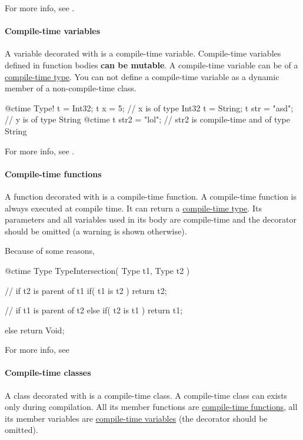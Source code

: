 For more info, see .

\paragraph{Compile-time variables}
A variable decorated with  is a compile-time variable. Compile-time variables defined in function bodies \textbf{can be mutable}. A compile-time variable can be of a \hyperref[ctime:class]{compile-time type}. You can not define a compile-time variable as a dynamic member of a non-compile-time class.

\begin{code}
@ctime Type! t = Int32;
t x = 5; // x is of type Int32
t = String;
t str = "asd"; // y is of type String
@ctime t str2 = "lol"; // str2 is compile-time and of type String
\end{code}

For more info, see .

\paragraph{Compile-time functions}
A function decorated with  is a compile-time function. A compile-time function is always executed at compile time. It can return a \hyperref[ctime:class]{compile-time type}. Its parameters and all variables used in its body are compile-time and the  decorator should be omitted (a warning is shown otherwise).

Because of some reasons, 

\begin{code}
@ctime Type TypeIntersection( Type t1, Type t2 ) {
	// if t2 is parent of t1
	if( t1 is t2 )
		return t2;
		
	// if t1 is parent of t2
	else if( t2 is t1 )
		return t1;
	
	else
		return Void;
}
\end{code}

For more info, see 

\paragraph{Compile-time classes}
A class decorated with  is a compile-time class. A compile-time class can exists only during compilation. All its member functions are \hyperref[ctime:function]{compile-time functions}, all its member variables are \hyperref[ctime:variable]{compile-time variables} (the  decorator should be omitted).

